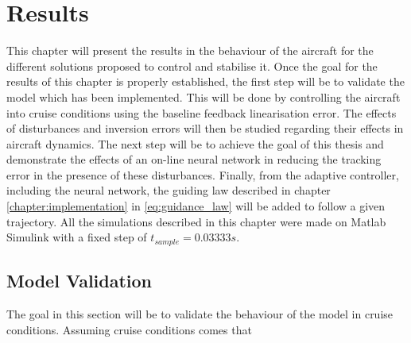 
\chapter{Results}
\label{chapter:results}

This chapter will present the results in the behaviour of the aircraft for the different solutions proposed to control and stabilise it. Once the goal for the results of this chapter is properly established, the first step will be to validate the model which has been implemented. This will be done by controlling the aircraft into cruise conditions using the baseline feedback linearisation error. The effects of disturbances and inversion errors will then be studied regarding their effects in aircraft dynamics. The next step will be to achieve the goal of this thesis and demonstrate the effects of an on-line neural network in reducing the tracking error in the presence of these disturbances. Finally, from the adaptive controller, including the neural network, the guiding law described in chapter \ref{chapter:implementation} in \ref{eq:guidance_law} will be added to follow a given trajectory. 
All the simulations described in this chapter were made on Matlab Simulink with a fixed step of $t_{sample} = 0.03333 s$.


\section{Model Validation}
\label{section:results/validation}

The goal in this section will be to validate the behaviour of the model in cruise conditions. Assuming cruise conditions comes that

